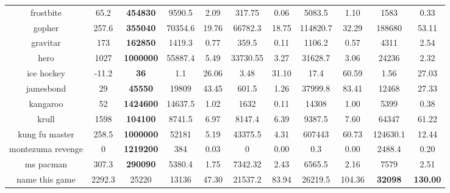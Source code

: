 \begin{center}
\begin{tabular}{ccccccccccc}
 frostbite          & 65.2      & \textbf{454830}    & 9590.5   &2.09    & 317.75     & 0.06       & 5083.5  & 1.10                                 & 1583            & 0.33        \\          
 gopher             & 257.6     & \textbf{355040}             & 70354.6  &19.76   & 66782.3    & 18.75      & 114820.7& 32.29                                & 188680          & 53.11 \\
 gravitar           & 173       & \textbf{162850}    & 1419.3   &0.77    & 359.5      & 0.11       & 1106.2  & 0.57                                 & 4311             & 2.54        \\
 hero               & 1027      & \textbf{1000000}            & 55887.4  &5.49    & 33730.55   & 3.27       & 31628.7 & 3.06                        & 24236            & 2.32 \\
 ice hockey         & -11.2     & \textbf{36}                 & 1.1      &26.06   & 3.48       & 31.10      & 17.4    & 60.59                                & 1.56             & 27.03 \\
 jamesbond          & 29        & \textbf{45550}              & 19809    &43.45   & 601.5      & 1.26       & 37999.8 & 83.41                                & 12468           & 27.33 \\
 kangaroo           & 52        & \textbf{1424600}            & 14637.5  &1.02    & 1632       & 0.11       & 14308   & 1.00                        & 5399           & 0.38       \\
 krull              & 1598      & \textbf{104100}    & 8741.5   &6.97    & 8147.4     & 6.39       & 9387.5  & 7.60                                          & 64347            & 61.22              \\
 kung fu master     & 258.5     & \textbf{1000000}   & 52181    &5.19    & 43375.5    & 4.31       & 607443  & 60.73                                         & 124630.1            & 12.44        \\
 montezuma revenge  &0          & \textbf{1219200}   & 384      &0.03    & 0          & 0.00       & 0.3     & 0.00                                 & 2488.4           & 0.20       \\
 ms pacman          & 307.3     & \textbf{290090}    & 5380.4   &1.75    & 7342.32    & 2.43       & 6565.5  & 2.16                                 & 7579             & 2.51     \\
 name this game     & 2292.3    & 25220              & 13136    &47.30   & 21537.2    & 83.94      & 26219.5 & 104.36                               &\textbf{32098}             &\textbf{130.00}  \\

\end{tabular}
\end{center}
